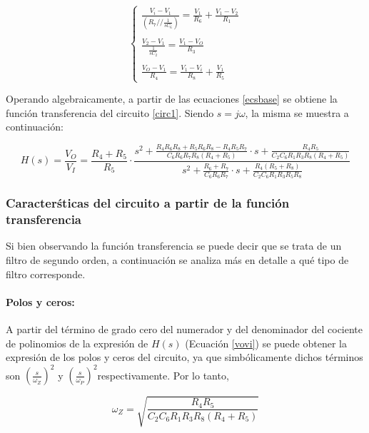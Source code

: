 \begin{equation}
\begin{cases}
\frac{V_i - V_1}{(R_7 // \frac{1}{sC_6})} = \frac{V_1}{R_6} + \frac{V_1 - V_2}{R_1}\\ \\
\frac{V_2 - V_1}{\frac{1}{sC_2}} = \frac{V_1 - V_O}{R_3}\\ \\
\frac{V_O - V_1}{R_4} = \frac{V_1 - V_i}{R_8} + \frac{V_1}{R_5}
\end{cases}
\label{ecsbase}
\end{equation}

Operando algebraicamente, a partir de las ecuaciones \ref{ecsbase} se obtiene la funci\'on transferencia del circuito \ref{circ1}. Siendo $s = j\omega$, la misma se muestra a continuaci\'on:

\begin{equation}
H(s) = \frac{V_O}{V_I} = \frac{R_4 + R_5}{R_5} \cdot 
\frac
{ s^2
	+\frac{R_4 R_6 R_8 + R_5 R_6 R_8 - R_4 R_5 R_7}{C_6 R_6 R_7 R_8 (R_4 + R_5)} \cdot s
	+\frac{R_4 R_5}{C_2 C_6 R_1 R_3 R_8 (R_4 + R_5)}}
{s^2
	+\frac{R_6 + R_7}{C_6 R_6 R_7} \cdot s
	+\frac{R_4 (R_5 + R_8)}{C_2 C_6 R_1 R_3 R_5 R_8}
}
\label{vovi}
\end{equation}


\subsubsection{Caracter\'sticas del circuito a partir de la funci\'on transferencia}

Si bien observando la funci\'on transferencia se puede decir que se trata de un filtro de segundo orden, a continuaci\'on se analiza m\'as en detalle a qu\'e tipo de filtro corresponde.

\paragraph*{Polos y ceros:}
A partir del t\'ermino de grado cero del numerador y del denominador del cociente de polinomios de la expresi\'on de $H(s)$ (Ecuaci\'on \ref{vovi}) se puede obtener la expresi\'on de los polos y ceros del circuito, ya que simb\'olicamente dichos t\'erminos son $\left(\frac{s}{\omega_Z}\right)^2$ y $\left(\frac{s}{\omega_P}\right)^2$respectivamente. Por lo tanto,

\begin{equation}
\omega_Z = \sqrt{\frac{R_4 R_5}{C_2 C_6 R_1 R_3 R_8 (R_4 + R_5)}}
\label{ec_z}
\end{equation}

